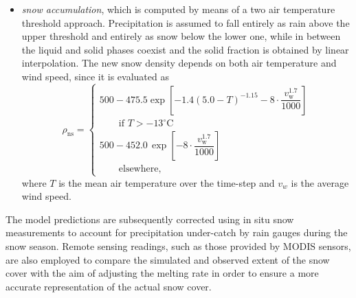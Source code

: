 \begin{itemize}[label=$\blacktriangleright$]
    by 
    \begin{equation}
    \frac{\partial \theta_{\mathrm{w}}^{\mathrm{fl}}}{\partial t}
    + \nabla \cdot \boldsymbol{J}_{\mathrm{w}} + S_{\mathrm{w}} = 0 ,
    \label{eq:liquid_water_content}
    \end{equation}
    where $\theta_{\mathrm{w}}^{\mathrm{fl}}$ is the liquid water content, $\boldsymbol{J}_{\mathrm{w}}$ the flux of liquid water and $S_{\mathrm{w}}$ the 
    liquid water sink term. No percolation occurs until the liquid water content exceeds the saturation threshold of 3--5\% of the snow layer mass
    (see Chapter \ref{cap:snow_basics}). Refreezing in sub-freezing layers is also accounted for: the internal energy carried by the water flux is tracked, 
    and latent heat is released whenever refreezing occurs.
    \item \textit{snow accumulation}, which is computed by means of a two air temperature threshold approach. Precipitation is assumed to fall entirely as 
    rain above the upper threshold and entirely as snow below the lower one, while in between the liquid and solid phases coexist and the solid fraction is 
    obtained by linear interpolation. 
    The new snow density depends on both air temperature and wind speed, since it is evaluated as 
    \begin{equation}
        \rho_{\mathrm{ns}} =
        \begin{cases}
            500 - 475.5\exp\!\left[-1.4(5.0 - T)^{-1.15}
            - 8 \cdot \dfrac{v_{\mathrm{w}}^{1.7}}{1000}\right] \\[1ex]
            \qquad \text{if } T > -13^{\circ}\mathrm{C} \\[3ex]
            500 - 452.0\,\exp\!\left[-8 \cdot \dfrac{v_{\mathrm{w}}^{1.7}}{1000}\right] \\[1ex]
            \qquad  \text{elsewhere,}
        \end{cases}
        \label{eq:rho_swe_snow_GEOtop}
    \end{equation}
    where $T$ is the mean air temperature over the time-step and $v_w$ is the average wind speed.
\end{itemize}

The model predictions are subsequently corrected using in situ snow measurements to account for precipitation under-catch by rain gauges during the snow 
season. Remote sensing readings, such as those provided by MODIS sensors, are also employed to compare the simulated and observed extent of the snow 
cover with the aim of adjusting the melting rate in order to ensure a more accurate representation of the actual snow cover.

